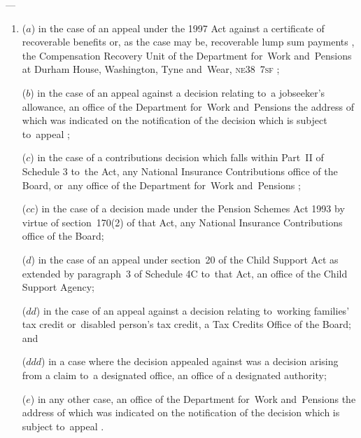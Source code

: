 \documentclass[12pt,a4paper]{article}
\begin{document}
—
\begin{enumerate}\item[]
($a$) in the case of an appeal under the 1997 Act against a certificate of recoverable benefits
or, as the case may be, recoverable lump sum payments%
, the Compensation Recovery Unit of the 
Department for~Work and~Pensions  %
at 
Durham House, Washington, Tyne and~Wear, \textsc{\lowercase{NE38~7SF}}%
;

($b$) in the case of an appeal against a decision relating to~a jobseeker’s allowance, an office of the 
Department for~Work and~Pensions the address of which was indicated on the notification of the decision which is subject to~appeal%
;

($c$) in the case of a contributions decision which falls within Part~II of Schedule 3 to~the Act, any National Insurance Contributions office
of the Board, or~any office of the 
Department for~Work and~Pensions%
;  %

($cc$) in the case of a decision made under the Pension Schemes Act 1993 by virtue of section~170(2) of that Act, any National Insurance Contributions office of the Board;

($d$) in the case of an appeal under section~20 of the Child Support Act as extended by paragraph~3 of Schedule 4C to~that Act, an office of the Child Support Agency; %

($dd$) in the case of an appeal against a decision relating to~working families' tax credit or~disabled person’s tax credit, a Tax Credits Office of the Board; and

($ddd$) in a case where the decision appealed against was a decision arising from a claim to~a designated office, an office of a designated authority;

($e$) in any other case, an office of the 
Department for~Work and~Pensions the address of which was indicated on the notification of the decision which is subject to~appeal%
.
\end{enumerate}
\end{document}
